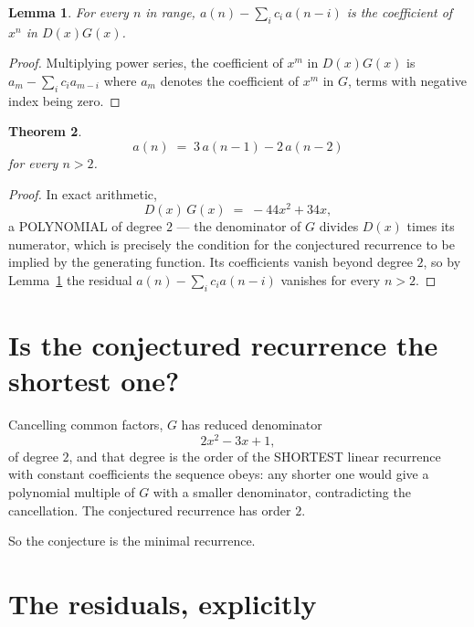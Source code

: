 \documentclass[11pt,a4paper]{article}
\theoremstyle{plain}
\newtheorem{theorem}{Theorem}
\newtheorem{lemma}[theorem]{Lemma}
\theoremstyle{definition}
\begin{document}
\begin{lemma}\label{lem:key}
For every $n$ in range, $a(n)-\sum_i c_i\,a(n-i)$ is the coefficient of $x^{n}$ in
$D(x)G(x)$.
\end{lemma}

\begin{proof}
Multiplying power series, the coefficient of $x^{m}$ in $D(x)G(x)$ is
$a_m-\sum_i c_i a_{m-i}$ where $a_m$ denotes the coefficient of $x^{m}$ in $G$, terms with
negative index being zero.
\end{proof}

\begin{theorem}
\[
a(n)\;=\;3\,a(n-1) - 2\,a(n-2)
\]
for every $n>2$.
\end{theorem}

\begin{proof}
In exact arithmetic,
\[
D(x)\,G(x)\;=\;- 44 x^{2} + 34 x,
\]
a POLYNOMIAL of degree $2$ --- the denominator of $G$ divides $D(x)$ times its numerator,
which is precisely the condition for the conjectured recurrence to be implied by the
generating function. Its coefficients vanish beyond degree $2$, so by
Lemma~\ref{lem:key} the residual $a(n)-\sum_ic_ia(n-i)$ vanishes for every
$n>2$.
\end{proof}

\section{Is the conjectured recurrence the shortest one?}

Cancelling common factors, $G$ has reduced denominator
\[
2 x^{2} - 3 x + 1,
\]
of degree $2$, and that degree is the order of the SHORTEST linear recurrence with
constant coefficients the sequence obeys: any shorter one would give a polynomial multiple of
$G$ with a smaller denominator, contradicting the cancellation. The conjectured recurrence has
order $2$.

So the conjecture is the minimal recurrence.

\section{The residuals, explicitly}
\end{document}
